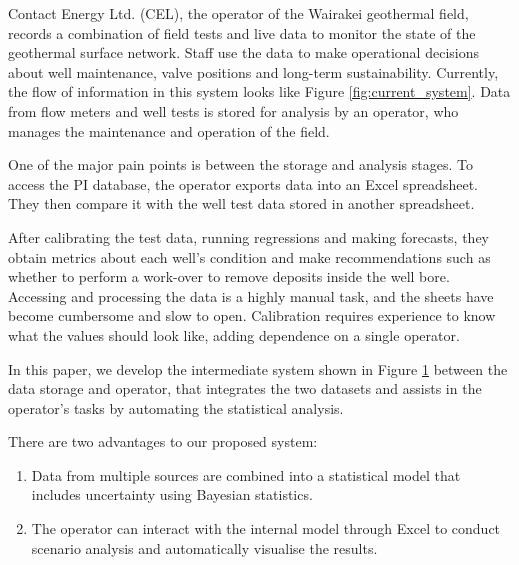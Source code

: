 \documentclass[a4paper, 12pt]{article}
\begin{document}
\begin{figure}
\begin{minipage}[t]{.48\textwidth}
  \label{fig:proposed_system}
\end{minipage}
\end{figure}

Contact Energy Ltd. (CEL), the operator of the Wairakei geothermal field, records a combination of field tests and live data to monitor the state of the geothermal surface network. Staff use the data to make operational decisions about well maintenance, valve positions and long-term sustainability. Currently, the flow of information in this system looks like Figure \ref{fig:current_system}. Data from flow meters and well tests is stored for analysis by an operator, who manages the maintenance and operation of the field. 

One of the major pain points is between the storage and analysis stages. To access the PI database, the operator exports data into an Excel spreadsheet. They then compare it with the well test data stored in another spreadsheet.

After calibrating the test data, running regressions and making forecasts, they obtain metrics about each well's condition and make recommendations such as whether to perform a work-over to remove deposits inside the well bore. Accessing and processing the data is a highly manual task, and the sheets have become cumbersome and slow to open. Calibration requires experience to know what the values should look like, adding dependence on a single operator.

In this paper, we develop the intermediate system shown in Figure \ref{fig:proposed_system} between the data storage and operator, that integrates the two datasets and assists in the operator's tasks by automating the statistical analysis.

There are two advantages to our proposed system:
\begin{enumerate}
\item Data from multiple sources are combined into a statistical model that includes uncertainty using Bayesian statistics.
\item The operator can interact with the internal model through Excel to conduct scenario analysis and automatically visualise the results.
\end{enumerate}

\end{document}
